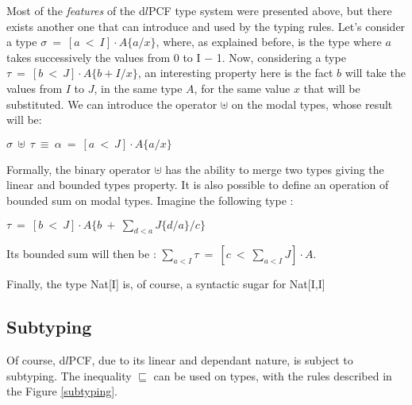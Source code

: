 \documentclass[a4paper,12pt]{article}
\begin{document}
Most of the \emph{features} of the d$l$PCF type system were presented above, but
there exists another one that can introduce and used by the typing rules. Let's
consider a type $\sigma~=~[a~<~I] \cdot A\{a/x\}$, where, as explained before,
is the type where $a$ takes successively the values from 0 to I $-$ 1. Now,
considering a type $\tau~=~[b~<~J] \cdot A\{b+I/x\}$, an interesting property
here is the fact $b$ will take the values from $I$ to $J$, in the same type $A$,
for the same value $x$ that will be substituted. We can introduce the operator
$\uplus$ on the modal types, whose result will be:

\begin{center}
$\sigma~\uplus~\tau~\equiv~\alpha~=~[a~<~J] \cdot A\{a/x\}$
\end{center}

Formally, the binary operator $\uplus$ has the ability to merge two types giving
the linear and bounded types property. It is also possible to define an
operation of bounded sum on modal types. Imagine the following type :

\begin{center}
  $\tau~=~[b~<~J] \cdot A\{b~+~\sum_{d<a}J\{d/a\}/c\}$
\end{center}

Its bounded sum will then be : $\sum_{a<I} \tau ~=~ [c~<~\sum_{a<I}J] \cdot A$. 

Finally, the type Nat[I] is, of course, a syntactic sugar for Nat[I,I]

\subsection{Subtyping}

Of course, d$l$PCF, due to its linear and dependant nature, is subject to
subtyping. The inequality $\sqsubseteq$ can be used on types, with the rules
described in the Figure \ref{subtyping}.
\end{document}
